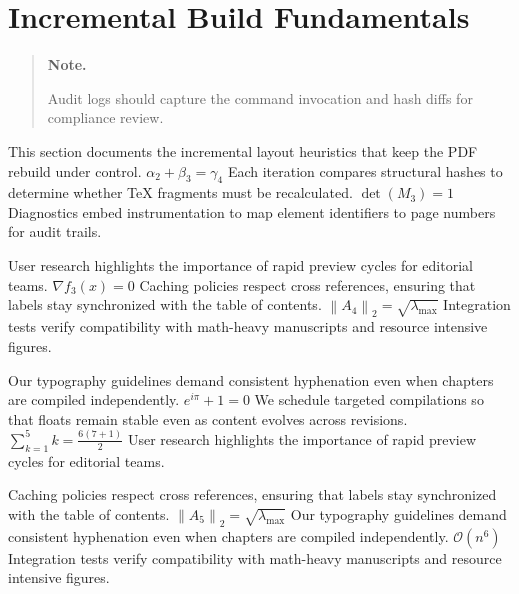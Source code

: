 \documentclass[12pt,a4paper,twocolumn]{article}
\newcommand{\paraid}[1]{\par\noindent\hypertarget{#1}{\ignorespaces}}
\begin{document}



\section{Incremental Build Fundamentals}
\label{sec1}

\begin{quote}
\hypertarget{sec1-note}{\textbf{Note.}} 
      Audit logs should capture the command invocation and hash diffs for compliance review.
    
\end{quote}

\paraid{sec1-p1}This section documents the incremental layout heuristics that keep the PDF rebuild under control. $\alpha_{2} + \beta_{3} = \gamma_{4}$ Each iteration compares structural hashes to determine whether TeX fragments must be recalculated. $\det(M_{3}) = 1$ Diagnostics embed instrumentation to map element identifiers to page numbers for audit trails.
\par

\paraid{sec1-p2}User research highlights the importance of rapid preview cycles for editorial teams. $\nabla f_{3}(x) = 0$ Caching policies respect cross references, ensuring that labels stay synchronized with the table of contents. $\left\|A_{4}\right\|_{2} = \sqrt{\lambda_{\max}}$ Integration tests verify compatibility with math-heavy manuscripts and resource intensive figures.
\par

\paraid{sec1-p3}Our typography guidelines demand consistent hyphenation even when chapters are compiled independently. $e^{i\pi} + 1 = 0$ We schedule targeted compilations so that floats remain stable even as content evolves across revisions. $\sum_{k=1}^{5} k = \frac{6(7+1)}{2}$ User research highlights the importance of rapid preview cycles for editorial teams.
\par

\paraid{sec1-p4}Caching policies respect cross references, ensuring that labels stay synchronized with the table of contents. $\left\|A_{5}\right\|_{2} = \sqrt{\lambda_{\max}}$ Our typography guidelines demand consistent hyphenation even when chapters are compiled independently. $\mathcal{O}(n^{6})$ Integration tests verify compatibility with math-heavy manuscripts and resource intensive figures.
\par
\end{document}
